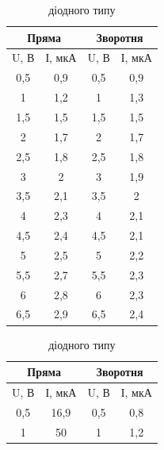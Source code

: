 \documentclass[a4paper,14pt]{extreport}
\begin{document}
\begin{table}[!h]
    \caption{ВАХ сенсорів освітленості}
    \begin{subtable}{.5\linewidth}
      \centering
     \caption{резистивного типу}
\begin{tabular}{|c|c|c|c|}
\hline
\multicolumn{2}{|c|}{Пряма} & \multicolumn{2}{c|}{Зворотня} \\ \hline
U, В        & І, мкА        & U, В         & І, мкА         \\ \hline
0,5         & 0,9           & 0,5          & 0,9            \\ \hline
1           & 1,2           & 1            & 1,3            \\ \hline
1,5         & 1,5           & 1,5          & 1,5            \\ \hline
2           & 1,7           & 2            & 1,7            \\ \hline
2,5         & 1,8           & 2,5          & 1,8            \\ \hline
3           & 2             & 3            & 1,9            \\ \hline
3,5         & 2,1           & 3,5          & 2              \\ \hline
4           & 2,3           & 4            & 2,1            \\ \hline
4,5         & 2,4           & 4,5          & 2,1            \\ \hline
5           & 2,5           & 5            & 2,2            \\ \hline
5,5         & 2,7           & 5,5          & 2,3            \\ \hline
6           & 2,8           & 6            & 2,3            \\ \hline
6,5         & 2,9           & 6,5          & 2,4            \\ \hline
\end{tabular}
\end{subtable}%
\begin{subtable}{.5\linewidth}
\centering
 \caption{діодного типу}
\begin{tabular}{|c|c|c|c|}
\hline
\multicolumn{2}{|c|}{Пряма} & \multicolumn{2}{c|}{Зворотня} \\ \hline
U, В        & І, мкА        & U, В         & І, мкА         \\ \hline
0,5         & 16,9          & 0,5          & 0,8            \\ \hline
1           & 50            & 1            & 1,2            \\ \hline

\end{tabular}
\end{subtable}
\end{table}
\end{document}
